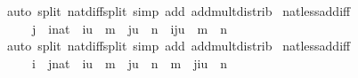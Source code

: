 \begin{isabellebody}
%
\isadelimproof
%
\endisadelimproof
%
\isatagproof
{}\isamarkupfalse%
\ {\isacharparenleft}{\kern0pt}auto\ split{\isacharcolon}{\kern0pt}\ nat{\isacharunderscore}{\kern0pt}diff{\isacharunderscore}{\kern0pt}split\ simp\ add{\isacharcolon}{\kern0pt}\ add{\isacharunderscore}{\kern0pt}mult{\isacharunderscore}{\kern0pt}distrib{\isacharparenright}{\kern0pt}%
\endisatagproof
{\isafoldproof}%
%
\isadelimproof
\isanewline
%
\endisadelimproof
\isanewline
{}\isamarkupfalse%
\ nat{\isacharunderscore}{\kern0pt}less{\isacharunderscore}{\kern0pt}add{\isacharunderscore}{\kern0pt}iff{}{\isacharcolon}{\kern0pt}\isanewline
\ \ \ \ \ {\isachardoublequoteopen}j\ {\isacharless}{\kern0pt}{\isacharequal}{\kern0pt}\ {\isacharparenleft}{\kern0pt}i{\isacharcolon}{\kern0pt}{\isacharcolon}{\kern0pt}nat{\isacharparenright}{\kern0pt}\ {\isacharequal}{\kern0pt}{\isacharequal}{\kern0pt}{\isachargreater}{\kern0pt}\ {\isacharparenleft}{\kern0pt}i{\isacharasterisk}{\kern0pt}u\ {\isacharplus}{\kern0pt}\ m\ {\isacharless}{\kern0pt}\ j{\isacharasterisk}{\kern0pt}u\ {\isacharplus}{\kern0pt}\ n{\isacharparenright}{\kern0pt}\ {\isacharequal}{\kern0pt}\ {\isacharparenleft}{\kern0pt}{\isacharparenleft}{\kern0pt}i{\isacharminus}{\kern0pt}j{\isacharparenright}{\kern0pt}{\isacharasterisk}{\kern0pt}u\ {\isacharplus}{\kern0pt}\ m\ {\isacharless}{\kern0pt}\ n{\isacharparenright}{\kern0pt}{\isachardoublequoteclose}\isanewline
%
\isadelimproof
%
\endisadelimproof
%
\isatagproof
{}\isamarkupfalse%
\ {\isacharparenleft}{\kern0pt}auto\ split{\isacharcolon}{\kern0pt}\ nat{\isacharunderscore}{\kern0pt}diff{\isacharunderscore}{\kern0pt}split\ simp\ add{\isacharcolon}{\kern0pt}\ add{\isacharunderscore}{\kern0pt}mult{\isacharunderscore}{\kern0pt}distrib{\isacharparenright}{\kern0pt}%
\endisatagproof
{\isafoldproof}%
%
\isadelimproof
\isanewline
%
\endisadelimproof
\isanewline
{}\isamarkupfalse%
\ nat{\isacharunderscore}{\kern0pt}less{\isacharunderscore}{\kern0pt}add{\isacharunderscore}{\kern0pt}iff{}{\isacharcolon}{\kern0pt}\isanewline
\ \ \ \ \ {\isachardoublequoteopen}i\ {\isacharless}{\kern0pt}{\isacharequal}{\kern0pt}\ {\isacharparenleft}{\kern0pt}j{\isacharcolon}{\kern0pt}{\isacharcolon}{\kern0pt}nat{\isacharparenright}{\kern0pt}\ {\isacharequal}{\kern0pt}{\isacharequal}{\kern0pt}{\isachargreater}{\kern0pt}\ {\isacharparenleft}{\kern0pt}i{\isacharasterisk}{\kern0pt}u\ {\isacharplus}{\kern0pt}\ m\ {\isacharless}{\kern0pt}\ j{\isacharasterisk}{\kern0pt}u\ {\isacharplus}{\kern0pt}\ n{\isacharparenright}{\kern0pt}\ {\isacharequal}{\kern0pt}\ {\isacharparenleft}{\kern0pt}m\ {\isacharless}{\kern0pt}\ {\isacharparenleft}{\kern0pt}j{\isacharminus}{\kern0pt}i{\isacharparenright}{\kern0pt}{\isacharasterisk}{\kern0pt}u\ {\isacharplus}{\kern0pt}\ n{\isacharparenright}{\kern0pt}{\isachardoublequoteclose}\isanewline

\end{isabellebody}
